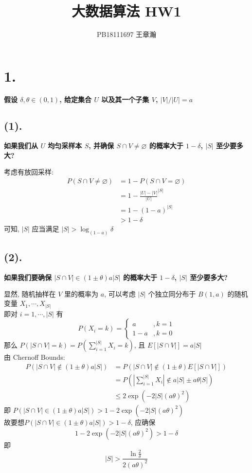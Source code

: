 \documentclass[UTF8]{article}
\title{大数据算法 HW1}
\author{PB18111697 王章瀚}
\newcommand{\jumpLine} {\hspace*{\fill} \par}
\begin{document}
\maketitle
\section*{1.}
\noindent \textbf{假设 $\delta, \theta\in (0,1)$, 给定集合 $U$ 以及其一个子集 $V$, $|V|/|U|=a$}
\subsection*{(1).}
\noindent \textbf{如果我们从 $U$ 均匀采样本 $S$, 并确保 $S\cap V\not=\varnothing$ 的概率大于 $1-\delta$, $|S|$ 至少要多大?}
\jumpLine \noindent 
考虑有放回采样:
\begin{align*}
	P(S\cap V\not=\varnothing)&=1-P(S\cap V=\varnothing) \\
	&=1- \frac{|U|-|V|}{|U|}^{|S|} \\
	&=1-(1-a)^{|S|} \\
	&>1-\delta
\end{align*}
可知, $|S|$ 应当满足 $|S|>\log_{(1-a)}\delta$

\subsection*{(2).}
\noindent \textbf{如果我们要确保 $|S\cap V|\in (1\pm\theta)a|S|$ 的概率大于 $1-\delta$, $|S|$ 至少要多大?}
\jumpLine \noindent 
显然, 随机抽样在 $V$ 里的概率为 $a$, 可以考虑 $|S|$ 个独立同分布于 $B(1,a)$ 的随机变量 $X_1,\cdots,X_{|S|}$\\
即对 $i=1,\cdots,|S|$ 有
$$P(X_i=k)=\left\{\begin{array}{ll}a & ,k=1 \\ 1-a & ,k = 0\end{array}\right.$$
那么 $P(|S\cap V|=k)=P(\sum\limits_{i=1}^{|S|}X_i=k)$, 且 $E[|S\cap V|]=a|S|$ \\
由 Chernoff Bounds: 
\begin{align*}
	P(|S\cap V|\notin (1\pm\theta)a|S|)&=P(|S\cap V|\notin (1\pm\theta)E[|S\cap V|])\\
	&=P\left(\left|\sum\limits_{i=1}^{|S|}X_i\right|\notin a|S|\pm a\theta|S| \right) \\
	&\le 2\exp(-2|S|(a\theta)^2)
\end{align*}
即 $P(|S\cap V|\in (1\pm\theta)a|S|)>1-2\exp(-2|S|(a\theta)^2)$ \\
故要想$P(|S\cap V|\in (1\pm\theta)a|S|)>1-\delta$, 应确保
$$1-2\exp(-2|S|(a\theta)^2) > 1-\delta$$
即 $$|S|>\frac{\ln\frac{2}{\delta}}{2(a\theta)^2}$$
\end{document}
